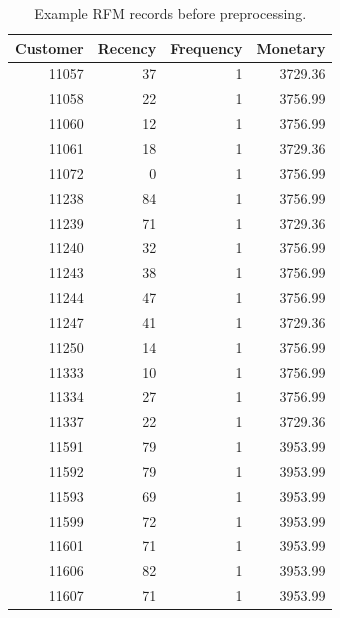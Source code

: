 \begin{table}[htbp]
  \centering
  \small
  \begin{tabular}{rrrr}
    \hline
    \textbf{Customer} & \textbf{Recency} & \textbf{Frequency} & \textbf{Monetary} \\
    \hline
    11057             & 37               & 1                  & 3729.36           \\
    11058             & 22               & 1                  & 3756.99           \\
    11060             & 12               & 1                  & 3756.99           \\
    11061             & 18               & 1                  & 3729.36           \\
    11072             & 0                & 1                  & 3756.99           \\
    11238             & 84               & 1                  & 3756.99           \\
    11239             & 71               & 1                  & 3729.36           \\
    11240             & 32               & 1                  & 3756.99           \\
    11243             & 38               & 1                  & 3756.99           \\
    11244             & 47               & 1                  & 3756.99           \\
    11247             & 41               & 1                  & 3729.36           \\
    11250             & 14               & 1                  & 3756.99           \\
    11333             & 10               & 1                  & 3756.99           \\
    11334             & 27               & 1                  & 3756.99           \\
    11337             & 22               & 1                  & 3729.36           \\
    11591             & 79               & 1                  & 3953.99           \\
    11592             & 79               & 1                  & 3953.99           \\
    11593             & 69               & 1                  & 3953.99           \\
    11599             & 72               & 1                  & 3953.99           \\
    11601             & 71               & 1                  & 3953.99           \\
    11606             & 82               & 1                  & 3953.99           \\
    11607             & 71               & 1                  & 3953.99           \\
    \hline
  \end{tabular}
  \caption{Example RFM records before preprocessing.}\label{tab:rfm_sample}
\end{table}

